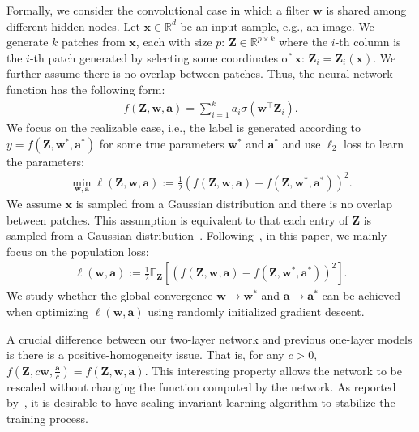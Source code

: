 \documentclass{article}
\newcommand{\firstlayer}{w}
\newcommand{\secondlayer}{a}
\def\vw{\mathbf{w}}
\def\va{\mathbf{a}}
\newcommand{\mat}[1]{\mathbf{#1}}
\newcommand{\vect}[1]{\mathbf{#1}}
\newcommand{\expect}{\mathbb{E}}
\begin{document}
Formally, we consider the convolutional case in which a filter $\vw$ is shared among different hidden nodes. Let $\vect{x} \in \mathbb{R}^{d}$ be an input sample, e.g., an image. We generate $k$ patches from $\vect{x}$, each with size $p$: $\mat Z \in \mathbb{R}^{p \times k}$ where the $i$-th column is the $i$-th patch generated by selecting some coordinates of $\vect{x}$: $\vect{Z}_i = \vect{Z}_i(\vect{x})$.
We further assume there is no overlap between patches.
Thus, the neural network function has the following form:
\begin{align*}
f(\mat{Z},\vect{w},\vect{\secondlayer}) =  \sum_{i=1}^{k} \secondlayer_i\sigma\left(\vect{w}^\top \vect{Z}_i\right).
\end{align*}We focus on the realizable case, i.e., the label is generated according to $y = f\left(\mat{Z},\vect{\firstlayer}^*,\vect{\secondlayer}^*\right)$ for some true parameters $\vect{\firstlayer}^*$ and $\vect{\secondlayer}^*$ and use $\ell_2$ loss to learn the parameters:\begin{align*}
\min_{\vect{w},\vect{\secondlayer}} \ell(\vect{Z},\vect{w},\vect{\secondlayer}) := \frac{1}{2}\left(f\left(\mat{Z},\vect{w},\vect{\secondlayer}\right) - f\left(\mat{Z},\vect{\firstlayer}^*,\vect{\secondlayer}^*\right)\right)^2. \label{eqn:individual_obj}
\end{align*}
We assume $\vect{x}$ is sampled from a Gaussian distribution and there is no overlap between patches.
This assumption is equivalent to that each entry of $\mat{Z}$ is sampled from a Gaussian distribution~\citep{brutzkus2017globally,zhong2017recovery}.
Following~\citep{zhong2017learning,zhong2017recovery,li2017convergence,tian2017analytical,brutzkus2017globally,shalev2017weight},
in this paper, we mainly focus on the population loss:
\begin{align*}
	\ell\left(\vect{w},\vect{\secondlayer}\right) := \frac12\expect_{\mat{Z}}\left[\left(f\left(\mat{Z},\vect{\firstlayer},\vect{\secondlayer}\right)-f\left(\mat{Z},\vect{\firstlayer}^*,\vect{\secondlayer}^*\right)\right)^2\right].
\end{align*}
We study whether the global convergence $\vw\rightarrow\vw^*$ and $\va\rightarrow\va^*$ can be achieved when optimizing $\ell(\vect{w},\vect{a})$ using randomly initialized gradient descent.

A crucial difference between our two-layer network and previous one-layer models is there is a positive-homogeneity issue.
That is, for any $c > 0$, $f\left(\mat{Z},c\vect{w},\frac{\vect{\secondlayer}}{c}\right) = f\left(\mat{Z},\vect{w},\vect{\secondlayer}\right)$.
This interesting
property allows the network to be rescaled without changing the function computed by the network.
As reported by~\cite{neyshabur2015path}, it is desirable to have scaling-invariant learning algorithm to stabilize the training process.
\end{document}
